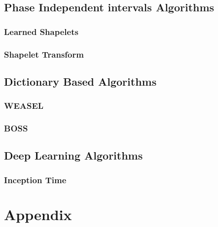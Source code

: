 \subsection{Phase Independent intervals Algorithms}

\subsubsection{Learned Shapelets}

\subsubsection{Shapelet Transform}


\subsection{Dictionary Based Algorithms}

\subsubsection{WEASEL}

\subsubsection{BOSS}


\subsection{Deep Learning Algorithms}

\subsubsection{Inception Time}

\null\newpage


\section{Appendix}

\null\newpage

% 
\printbibliography
\newpage

